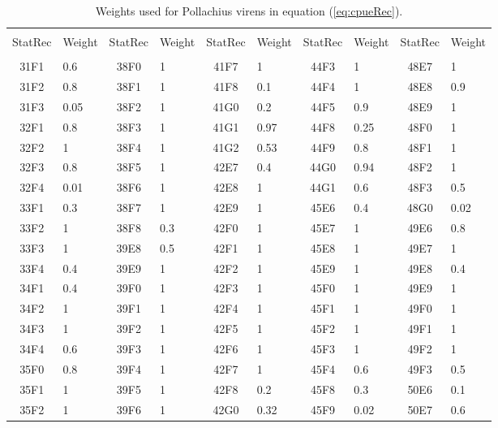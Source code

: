 \documentclass[a4paper 12pt]{article}
\numberwithin{equation}{section}
\begin{document}
{%
 \begin{small}
\begin{table}[h!]
\centering
\caption{Weights used for Pollachius virens in equation (\ref{eq:cpueRec}).}
\begin{footnotesize}
\begin{tabular}{clclclclcl}
  \hline \\ [0.3ex]
 StatRec & Weight & StatRec & Weight & StatRec & Weight & StatRec & Weight & StatRec & Weight  \\ [1.0ex]
  \hline \\ [0.3ex]
 31F1 &  0.6 & 38F0 &    1 & 41F7 &    1 & 44F3 &    1 & 48E7 &    1 \\ 
 31F2 &  0.8 & 38F1 &    1 & 41F8 &  0.1 & 44F4 &    1 & 48E8 &  0.9 \\ 
 31F3 & 0.05 & 38F2 &    1 & 41G0 &  0.2 & 44F5 &  0.9 & 48E9 &    1 \\ 
 32F1 &  0.8 & 38F3 &    1 & 41G1 & 0.97 & 44F8 & 0.25 & 48F0 &    1 \\ 
 32F2 &    1 & 38F4 &    1 & 41G2 & 0.53 & 44F9 &  0.8 & 48F1 &    1 \\ 
 32F3 &  0.8 & 38F5 &    1 & 42E7 &  0.4 & 44G0 & 0.94 & 48F2 &    1 \\ 
 32F4 & 0.01 & 38F6 &    1 & 42E8 &    1 & 44G1 &  0.6 & 48F3 &  0.5 \\ 
 33F1 &  0.3 & 38F7 &    1 & 42E9 &    1 & 45E6 &  0.4 & 48G0 & 0.02 \\ 
 33F2 &    1 & 38F8 &  0.3 & 42F0 &    1 & 45E7 &    1 & 49E6 &  0.8 \\ 
 33F3 &    1 & 39E8 &  0.5 & 42F1 &    1 & 45E8 &    1 & 49E7 &    1 \\ 
 33F4 &  0.4 & 39E9 &    1 & 42F2 &    1 & 45E9 &    1 & 49E8 &  0.4 \\ 
 34F1 &  0.4 & 39F0 &    1 & 42F3 &    1 & 45F0 &    1 & 49E9 &    1 \\ 
 34F2 &    1 & 39F1 &    1 & 42F4 &    1 & 45F1 &    1 & 49F0 &    1 \\ 
 34F3 &    1 & 39F2 &    1 & 42F5 &    1 & 45F2 &    1 & 49F1 &    1 \\ 
 34F4 &  0.6 & 39F3 &    1 & 42F6 &    1 & 45F3 &    1 & 49F2 &    1 \\ 
 35F0 &  0.8 & 39F4 &    1 & 42F7 &    1 & 45F4 &  0.6 & 49F3 &  0.5 \\ 
 35F1 &    1 & 39F5 &    1 & 42F8 &  0.2 & 45F8 &  0.3 & 50E6 &  0.1 \\ 
 35F2 &    1 & 39F6 &    1 & 42G0 & 0.32 & 45F9 & 0.02 & 50E7 &  0.6 \\ 

\end{tabular}
\end{footnotesize}
\end{table}
\end{small}}
\end{document}
